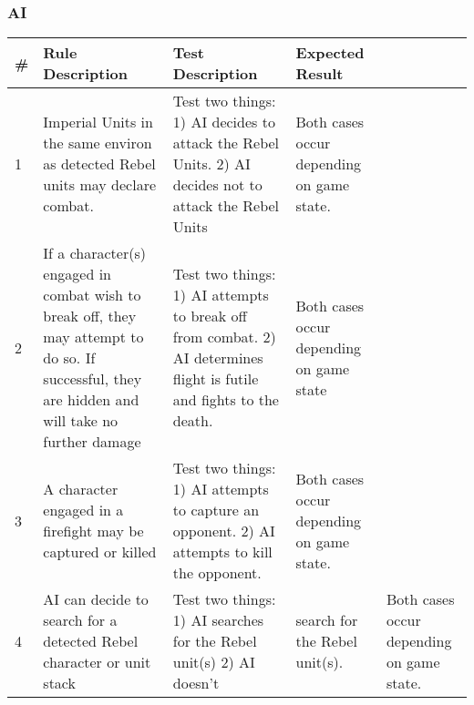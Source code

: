 \subsubsection{AI}
\begin{center}

  \begin{longtable}{| p{.5cm} | p{4.5cm} | p{4.5cm} | p{4.5cm} |}
    \hline
    \textbf{\#}&
    \textbf{Rule Description}&
    \textbf{Test Description}&
    \textbf{Expected Result}
    \\ \hline
    
    1 &

    Imperial Units in the same environ as detected Rebel units may
    declare combat. &

    Test two things: 1) AI decides to attack the Rebel Units. 2) 
    AI decides not to attack the Rebel Units &
    
    Both cases occur depending on game state.

    \\ \hline 

    2 &

    If a character(s) engaged in combat wish to break off, they may attempt
    to do so. If successful, they are hidden and will take no further damage &

    Test two things: 1) AI attempts to break off from combat. 2) AI determines 
    flight is futile and fights to the death. &

    Both cases occur depending on game state

    \\ \hline

    3 & 

    A character engaged in a firefight may be captured or killed &

    Test two things: 1) AI attempts to capture an opponent. 2) AI
    attempts to kill the opponent. &

    Both cases occur depending on game state.

    \\ \hline

    4 &

    AI can decide to search for a detected Rebel character or unit stack &

    Test two things: 1) AI searches for the Rebel unit(s) 2) AI doesn't &
    search for the Rebel unit(s). &

    Both cases occur depending on game state.


\end{longtable}
\end{center}

